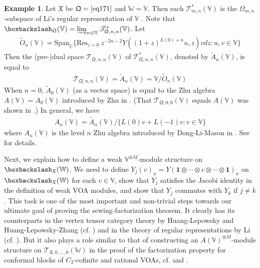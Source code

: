 \documentclass[11pt,b5paper,notitlepage]{article}
\theoremstyle{definition}
\newtheorem{eg}[df]{Example}
\theoremstyle{plain}
\newcommand{\fk}{\mathfrak}
\newcommand{\wtd}{\widetilde}
\newcommand{\idt}{\mathbf{1}}
\newcommand{\Res}{\mathrm{Res}}
\newcommand{\Span}{\mathrm{Span}}
\newcommand{\scr}{\mathscr}
\newcommand{\Vbb}{\mathbb V}
\newcommand{\Wbb}{\mathbb W}
\newcommand{\Cbb}{\mathbb C}
\newcommand{\Nbb}{\mathbb N}
\newcommand{\<}{\left\langle}
\renewcommand{\>}{\right\rangle}
\newcommand{\fx}{\mathfrak{X}}
\newcommand{\bbs}{\boxbackslash}
\newcommand{\fq}{{\mathfrak Q}}
\numberwithin{equation}{section}
\begin{document}
\begin{eg}\label{lb92}
Let $\fk X$ be $\fq=\eqref{eq171}$ and $\Wbb=\Vbb$. Then each $\scr T_{m,n}^*(\Vbb)$ is the $\Omega_{m,n}$-subspace of Li's regular representation of $\Vbb$ \cite{Li-regular-rep,LS-twisted-regular-rep}. Note that $\bbs_\fq(\Vbb)=\varinjlim_{n\in\Nbb}\scr T_{\fq,n,n}^*(\Vbb)$.  Let 
\begin{gather}
\wtd O_n(\Vbb)=\Span_\Cbb\big\{\Res_{z=0}~z^{-2n-2}Y((1+z)^{L(0)+n}u,z)vdz:u,v\in\Vbb  \big\}
\end{gather}
Then the (pre-)dual space $\scr T_{\fq,n,n}(\Vbb)$ of $\scr T_{\fq,n,n}^*(\Vbb)$, denoted by $\wtd A_n(\Vbb)$, is equal to
\begin{gather}
\scr T_{\fq,n,n}(\Vbb)=\wtd A_n(\Vbb)=\Vbb/\wtd O_n(\Vbb)
\end{gather}
When $n=0$, $\wtd A_0(\Vbb)$ (as a vector space) is equal to the Zhu algebra $A(\Vbb)=A_0(\Vbb)$ introduced by Zhu in \cite{Zhu-modular-invariance}. (That $\scr T_{\fq,0,0}(\Vbb)$ equals $A(\Vbb)$ was shown in \cite[Prop. 7.2.2 and A.2.7]{NT-P1_conformal_blocks}.) In general, we have
\begin{align}
A_n(\Vbb)=\wtd A_n(\Vbb)/\{L(0)v+L(-1)v:v\in\Vbb\}
\end{align}
where $A_n(\Vbb)$ is the level $n$ Zhu algebra introduced by Dong-Li-Mason in \cite{DLM-Zhu}. See %
\cite{Li-regular-AnV,Li-regular-bimodules} for details.
\end{eg}



Next, we explain how to define a weak $\Vbb^{\otimes M}$-module structure on $\bbs_\fx(\Wbb)$. We need to define $Y_j(v)_n=Y(\idt\otimes\cdots\otimes v\otimes\cdots\otimes\idt)_n$ on $\bbs_{\fx}(\Wbb)$ for each $v\in \Vbb$, show that $Y_j$ satisfies the Jacobi identity in the definition of weak VOA modules, and show that $Y_j$ commutes with $Y_k$ if $j\neq k$. This task is one of the most important and non-trivial steps towards our ultimate goal of proving the sewing-factorization theorem. It clearly has its counterparts in the vertex tensor category theory by Huang-Lepowsky and Huang-Lepowsky-Zhang (cf. \cite[Ch. 6]{HLZ4}) and in the theory of regular representations by Li (cf. \cite{Li-regular-rep}). But it also plays a role similar to that of constructing an $A(\Vbb)^{\otimes M}$-module structure on $\scr T_{\fx,0,\dots,0}(\Wbb)$ in the proof of the factorization property for conformal blocks of $C_2$-cofinite and rational VOAs, cf. \cite[Sec. 7.2]{NT-P1_conformal_blocks} and \cite[Sec. 6]{DGT2}. 
\end{document}
